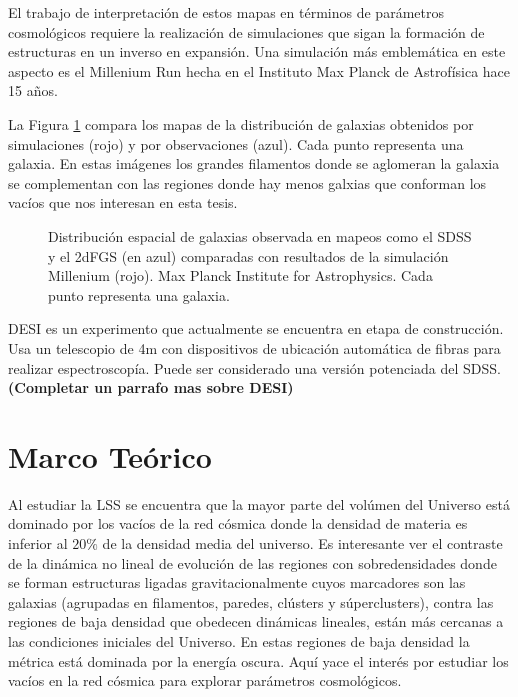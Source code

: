 \documentclass[preprint]{aastex62}
\begin{document}
El trabajo de interpretaci\'on de estos mapas en t\'erminos de
par\'ametros cosmol\'ogicos requiere la realizaci\'on de simulaciones
que sigan la formaci\'on de estructuras en un inverso en expansi\'on.
Una simulación m\'as emblem\'atica en este aspecto es el Millenium Run
hecha en el Instituto Max Planck de Astrof\'isica hace 15 a\~nos. 

La Figura \ref{fig:pie_millenium_walls} compara los mapas de la
distribuci\'on de galaxias obtenidos por simulaciones (rojo) y por
observaciones (azul).
Cada punto representa una galaxia.
En estas im\'agenes los grandes filamentos donde se aglomeran la
galaxia se complementan con las regiones donde hay menos galxias que
conforman los vac\'ios que nos interesan en esta tesis.

  \begin{figure}
    \caption{Distribuci\'on espacial de galaxias observada en mapeos
      como el SDSS y el 2dFGS (en azul) comparadas con resultados de
      la simulación Millenium (rojo). Max Planck Institute for
      Astrophysics.
      Cada punto representa una galaxia.
      \label{fig:pie_millenium_walls}}
  \end{figure}
  
  DESI es un experimento que actualmente se encuentra en etapa de construcción. Usa un telescopio de 4m con
  dispositivos de ubicación automática de fibras para realizar espectroscopía. Puede ser considerado una versión
  potenciada del SDSS. 
{\bf (Completar un parrafo mas sobre DESI)}

  \section{Marco Teórico}


  Al estudiar la LSS se encuentra que la mayor parte del volúmen del Universo está dominado
  por los vacíos de la red cósmica donde la densidad de materia es inferior al $20\%$ de la
  densidad media del universo. Es interesante ver el contraste de la dinámica no lineal de evolución de
  las regiones con sobredensidades donde se forman estructuras ligadas gravitacionalmente
  cuyos marcadores son las galaxias (agrupadas en filamentos, paredes, clústers y súperclusters),
  contra las regiones de baja densidad que obedecen dinámicas lineales, están más cercanas a
  las condiciones iniciales del Universo. En estas regiones de baja densidad la métrica está
  dominada por la energía oscura. Aquí yace el interés por estudiar los vacíos en la
  red cósmica para explorar parámetros cosmológicos.
\end{document}
